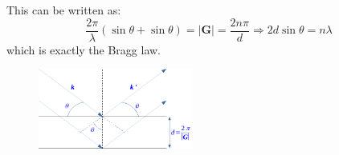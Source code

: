 \documentclass[10.75pt,a4paper,openright,bottom=2cm]{article}
\renewcommand{\Vec}[1]{\boldsymbol{#1}}
\begin{document}
This can be written as:
\[
\frac{2\pi}{\lambda}(\sin\theta+\sin\theta)=|\Vec{G}|=\frac{2n\pi}{d}\Rightarrow2d\sin\theta=n\lambda
\]
which is exactly the Bragg law.
\begin{figure}[h]
    \centering
    \includegraphics[width=0.45\textwidth]{bragg.pdf}
    \label{fig:bragg}
\end{figure}
\end{document}
